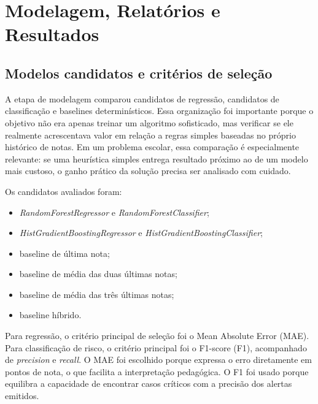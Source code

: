 \chapter{Modelagem, Relat\'orios e Resultados}
\label{cap:resultados}

\section{Modelos candidatos e crit\'erios de sele\c{c}\~ao}
\label{sec:candidatos}
\label{sec:objetivo-experimentos}
\label{sec:organizacao-experimental}
\label{sec:baselines-utilizados}
\label{sec:metricas-regressao}
\label{sec:metricas-classificacao}

A etapa de modelagem comparou candidatos de regress\~ao, candidatos de classifica\c{c}\~ao e baselines determin\'isticos. Essa organiza\c{c}\~ao foi importante porque o objetivo n\~ao era apenas treinar um algoritmo sofisticado, mas verificar se ele realmente acrescentava valor em rela\c{c}\~ao a regras simples baseadas no pr\'oprio hist\'orico de notas. Em um problema escolar, essa compara\c{c}\~ao \'e especialmente relevante: se uma heur\'istica simples entrega resultado pr\'oximo ao de um modelo mais custoso, o ganho pr\'atico da solu\c{c}\~ao precisa ser analisado com cuidado.

Os candidatos avaliados foram:
\begin{itemize}
    \item \textit{RandomForestRegressor} e \textit{RandomForestClassifier};
    \item \textit{HistGradientBoostingRegressor} e \textit{HistGradientBoostingClassifier};
    \item baseline de \'ultima nota;
    \item baseline de m\'edia das duas \'ultimas notas;
    \item baseline de m\'edia das tr\^es \'ultimas notas;
    \item baseline h\'ibrido.
\end{itemize}

Para regress\~ao, o crit\'erio principal de sele\c{c}\~ao foi o Mean Absolute Error (MAE). Para classifica\c{c}\~ao de risco, o crit\'erio principal foi o F1-score (F1), acompanhado de \textit{precision} e \textit{recall}. O MAE foi escolhido porque expressa o erro diretamente em pontos de nota, o que facilita a interpreta\c{c}\~ao pedag\'ogica. O F1 foi usado porque equilibra a capacidade de encontrar casos cr\'iticos com a precis\~ao dos alertas emitidos.

